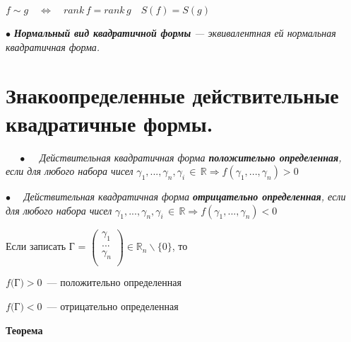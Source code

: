 \documentclass[a4paper, 12pt]{report}
\begin{document}
	$f \sim g \quad \Longleftrightarrow \quad rank\,f=rank\,g \quad S(f)=S(g)$
	\par\bigskip
	$\bullet$\textit{\textbf{ Нормальный вид квадратичной формы} --- эквивалентная ей нормальная квадратичная форма.}\\
	
	
	
	
	
	
	
	
	
	\section{Знакоопределенные действительные квадратичные формы.}
	$\quad\; \bullet\quad$ \textit{Действительная квадратичная форма \textbf{положительно определенная}\textit{, если для любого набора чисел}}
	$\gamma_1,...,\gamma_n, \gamma_i\, \in\, \mathbb{R} \Rightarrow f(\gamma_1,...,\gamma_n)>0$
	\par\bigskip
	$\bullet\quad$ \textit{Действительная квадратичная форма \textbf{отрицательно определенная}, если для любого набора чисел}
	$\gamma_1,...,\gamma_n, \gamma_i\, \in\, \mathbb{R} \Rightarrow f(\gamma_1,...,\gamma_n)<0$
	\par\bigskip
	Если записать Г = $\begin{pmatrix}
		\gamma_1\\
		...\\
		\gamma_n\\
	\end{pmatrix} \in \mathbb{R}_n \backslash \{0\}$, то
	
	$f($Г$)>0 \,$ --- положительно определенная
	
	$f($Г$)<0 \,$ --- отрицательно определенная
	\par \bigskip
	\textbf{Теорема}
	
\end{document}
